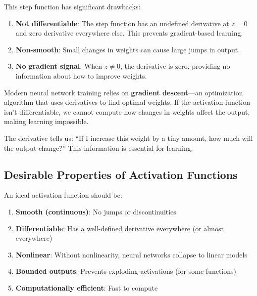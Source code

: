 This step function has significant drawbacks:

\begin{enumerate}
    \item \textbf{Not differentiable}: The step function has an undefined derivative at $z = 0$ and zero derivative everywhere else. This prevents gradient-based learning.
    
    \item \textbf{Non-smooth}: Small changes in weights can cause large jumps in output.
    
    \item \textbf{No gradient signal}: When $z \neq 0$, the derivative is zero, providing no information about how to improve weights.
\end{enumerate}

\begin{bluebox}
Modern neural network training relies on \textbf{gradient descent}---an optimization algorithm that uses derivatives to find optimal weights. If the activation function isn't differentiable, we cannot compute how changes in weights affect the output, making learning impossible.

The derivative tells us: ``If I increase this weight by a tiny amount, how much will the output change?'' This information is essential for learning.
\end{bluebox}

\subsection{Desirable Properties of Activation Functions}

An ideal activation function should be:

\begin{enumerate}
    \item \textbf{Smooth (continuous)}: No jumps or discontinuities
    \item \textbf{Differentiable}: Has a well-defined derivative everywhere (or almost everywhere)
    \item \textbf{Nonlinear}: Without nonlinearity, neural networks collapse to linear models
    \item \textbf{Bounded outputs}: Prevents exploding activations (for some functions)
    \item \textbf{Computationally efficient}: Fast to compute
\end{enumerate}

